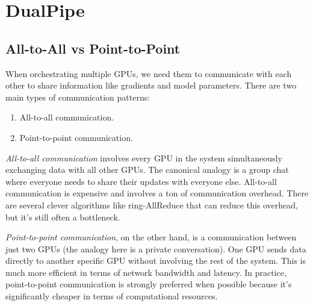 \chapter{DualPipe}


\section{All-to-All vs Point-to-Point}

When orchestrating multiple GPUs, we need them to communicate with each other to share information like gradients and model parameters. There are two main types of communication patterns: 
\begin{enumerate}
	\item All-to-all communication.
	\item Point-to-point communication.
\end{enumerate}

\textit{All-to-all communication} involves every GPU in the system simultaneously exchanging data with all other GPUs. The canonical analogy is a group chat where everyone needs to share their updates with everyone else. All-to-all communication is expensive and involves a ton of communication overhead. There are several clever algorithms like ring-AllReduce that can reduce this overhead, but it's still often a bottleneck.

\textit{Point-to-point communication}, on the other hand, is a communication between just two GPUs (the analogy here is a private conversation). One GPU sends data directly to another specific GPU without involving the rest of the system. This is much more efficient in terms of network bandwidth and latency. In practice, point-to-point communication is strongly preferred when possible because it's significantly cheaper in terms of computational resources.

